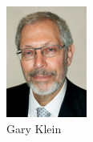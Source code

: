 \documentclass{article}
\begin{document}
\begin{figure}[H]
\centering
\begin{minipage}[H]{0.3\linewidth}
	\centering
	\includegraphics[width=\textwidth]{../ressources/klein}
	\caption{Gary Klein}
\end{minipage}
\hspace{0.1\linewidth}
\begin{minipage}[H]{0.3\linewidth}
	\centering

\end{minipage}
\end{figure}
\end{document}
